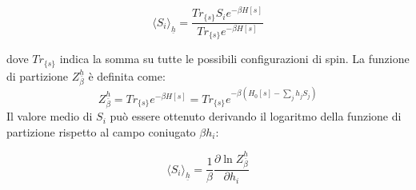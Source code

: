 \begin{tcolorbox}[colback=colorA!5, colframe=colorA, arc=3mm, boxrule=1.2pt]
\begin{equation}
\langle S_{i}\rangle_{\underline{h}}=\frac{Tr_{\{s\}}S_{i}e^{-\beta H[s]}}{Tr_{\{s\}}e^{-\beta H[s]}}
\end{equation}
\end{tcolorbox}

dove $Tr_{\{s\}}$ indica la somma su tutte le possibili configurazioni di spin.
La funzione di partizione $Z_{\beta}^{\underline{h}}$ è definita come:
\begin{equation}
Z_{\beta}^{\underline{h}} = Tr_{\{s\}}e^{-\beta H[s]} = Tr_{\{s\}}e^{-\beta (H_0[s]- \sum_j h_j S_j)}
\end{equation}
Il valore medio di $S_i$ può essere ottenuto derivando il logaritmo della funzione di partizione rispetto al campo coniugato $\beta h_i$:

\begin{tcolorbox}[colback=colorA!5, colframe=colorA, arc=3mm, boxrule=1.2pt]
\begin{equation}
\langle S_{i}\rangle_{\underline{h}}=\frac{1}{\beta}\frac{\partial \ln Z_{\beta}^{\underline{h}}}{\partial h_{i}}
\end{equation}
\end{tcolorbox}

